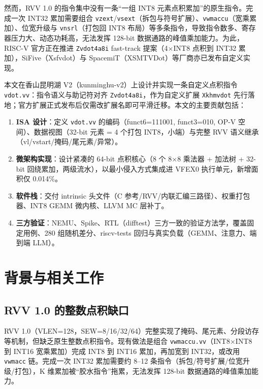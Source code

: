 \documentclass[11pt]{article}
\begin{document}
然而，RVV 1.0 的指令集中没有一条“一组 INT8 元素点积累加”的原生指令。完成一次 INT32 累加需要组合 \texttt{vzext}/\texttt{vsext}（拆包与符号扩展）、\texttt{vwmaccu}（宽乘累加）、位宽升级与 \texttt{vnsrl}（打包回 INT8 布局）等多条指令，导致指令数多、寄存器压力大、动态功耗高，无法发挥 128-bit 数据通路的峰值乘加能力。为此，RISC-V 官方正在推进 \texttt{Zvdot4a8i} fast-track 提案（4$\times$INT8 点积到 INT32 累加），SiFive（Xsfvdot）与 SpacemiT（XSMTVDot）等厂商亦已发布自定义实现。

本文在香山昆明湖 V2（kunminghu-v2）上设计并实现一条自定义点积指令 \texttt{vdot.vv}：指令语义与助记符对齐 \texttt{Zvdot4a8i}，作为自定义扩展 \texttt{Xkhmvdot} 先行落地；官方扩展正式发布后仅需改扩展名即可平滑迁移。本文的主要贡献包括：

\begin{enumerate}
  \item \textbf{ISA 设计}：定义 \texttt{vdot.vv} 的编码（funct6=111001, funct3=010, OP-V 空间）、数据视图（32-bit 元素 = 4 个打包 INT8，小端）与完整 RVV 语义继承（vl/vstart/掩码/尾元素/异常）。
  \item \textbf{微架构实现}：设计紧凑的 64-bit 点积核心（8 个 8$\times$8 乘法器 + 加法树 + 32-bit 回绕累加，两级流水），以最小侵入方式集成进 VFEX0 执行单元，新增面积仅 0.014\%。
  \item \textbf{软件栈}：交付 intrinsic 头文件（C 参考/RVV/内联汇编三路径）、权重打包器、INT8 GEMM 微内核、LLVM MC 层补丁。
  \item \textbf{三方验证}：NEMU、Spike、RTL（difftest）三方一致的验证方法学，覆盖固定用例、280 组随机差分、riscv-tests 回归与真实负载（GEMM、注意力、端到端 LLM）。
\end{enumerate}

\section{背景与相关工作}
\subsection{RVV 1.0 的整数点积缺口}
RVV 1.0（VLEN=128，SEW=8/16/32/64）完整实现了掩码、尾元素、分段访存等机制，但缺乏原生整数点积指令。现有做法是组合 \texttt{vwmaccu.vv}（INT8$\times$INT8 到 INT16 宽乘累加）完成 INT8 到 INT16 累加，再加宽到 INT32，或改用 \texttt{vwmacc} 链。完成一次 INT32 累加需要约 8--12 条指令（拆包/符号扩展/位宽升级/打包），K 维累加被“胶水指令”拖累，无法发挥 128-bit 数据通路的峰值乘加能力。
\end{document}
